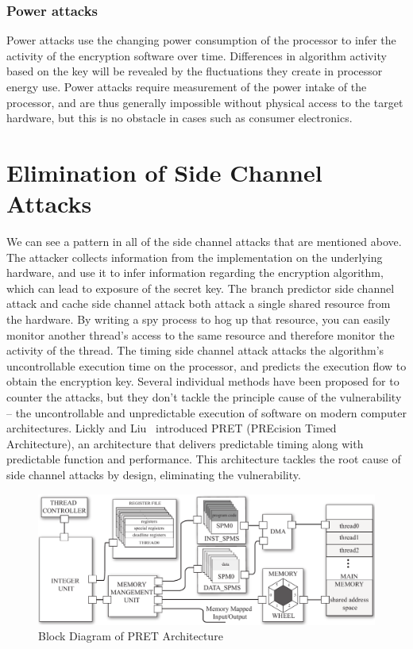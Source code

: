 \documentclass[times, 10pt,twocolumn]{article}
\begin{document}
\subsubsection{Power attacks}
Power attacks use the changing power consumption of the processor to infer the activity of the encryption software over time.  Differences in algorithm activity based on the key will be revealed by the fluctuations they create in processor energy use.  Power attacks require measurement of the power intake of the processor, and are thus generally impossible without physical access to the target hardware, but this is no obstacle in cases such as consumer electronics.

\section{Elimination of Side Channel Attacks}
We can see a pattern in all of the side channel attacks that are mentioned above. The attacker collects information from the implementation on the underlying hardware, and use it to infer information regarding the encryption algorithm, which can lead to exposure of the secret key. The branch predictor side channel attack and cache side channel attack both attack a single shared resource from the hardware. By writing a spy process to hog up that resource, you can easily monitor another thread's access to the same resource and therefore monitor the activity of the thread. The timing side channel attack attacks the algorithm's uncontrollable execution time on the processor, and predicts the execution flow to obtain the encryption key. Several individual methods have been proposed for to counter the attacks, but they don't tackle the principle cause of the vulnerability -- the uncontrollable and unpredictable execution of software on modern computer architectures. Lickly and Liu~\cite{pret_cases08} introduced PRET (PREcision Timed Architecture), an architecture that delivers predictable timing along with predictable function and performance. This architecture tackles the root cause of side channel attacks by design, eliminating the vulnerability.

\begin{figure}[ht]
  \centering
  \includegraphics[scale=.25]{./images/top_arch.pdf}
  \caption{Block Diagram of PRET Architecture}
  \label{fig:top_arch}
\end{figure}
\end{document}
